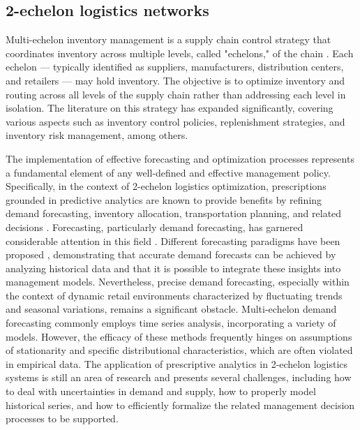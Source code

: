 \documentclass[opre,sglanonrev,11pt]{informs4}
\begin{document}
\subsection{2-echelon logistics networks}

Multi-echelon inventory management is a supply chain control strategy that coordinates inventory across multiple levels, called "echelons," of the chain \citep{Clark60}. Each echelon — typically identified as suppliers, manufacturers, distribution centers, and retailers — may hold inventory. The objective is to optimize inventory and routing across all levels of the supply chain rather than addressing each level in isolation. The literature on this strategy has expanded significantly, covering various aspects such as inventory control policies, replenishment strategies, and inventory risk management, among others. 

The implementation of effective forecasting and optimization processes represents a fundamental element of any well-defined and effective management policy. Specifically, in the context of 2-echelon logistics optimization, prescriptions grounded in predictive analytics are known to provide benefits by refining demand forecasting, inventory allocation, transportation planning, and related decisions \citep{VAD12,KK10,A01}. Forecasting, particularly demand forecasting, has garnered considerable attention in this field \citep{Shenstone01}. Different forecasting paradigms have been proposed \citep{Syntetos05,Keneley02,Ma15}, demonstrating that accurate demand forecasts can be achieved by analyzing historical data and that it is possible to integrate these insights into management models. Nevertheless, precise demand forecasting, especially within the context of dynamic retail environments characterized by fluctuating trends and seasonal variations, remains a significant obstacle. Multi-echelon demand forecasting commonly employs time series analysis, incorporating a variety of models.  However, the efficacy of these methods frequently hinges on assumptions of stationarity and specific distributional characteristics, which are often violated in empirical data. 
The application of prescriptive analytics in 2-echelon logistics systems is still an area of research and presents several challenges, including how to deal with uncertainties in demand and supply, how to properly model historical series, and how to efficiently formalize the related management decision processes to be supported. 


\end{document}
